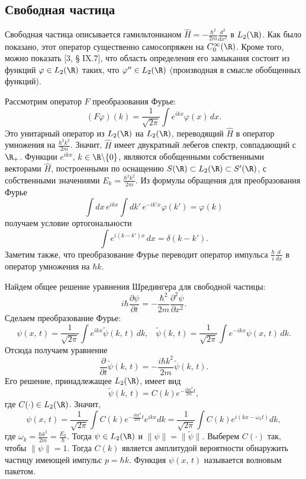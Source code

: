 \documentclass[a4paper
]{article}
\begin{document}
\subsection{Свободная частица}
Свободная частица описывается гамильтонианом $\hat H=-\frac{\hbar^2}
{2m}\frac{d^2}{dx^2}$ в $L_2(\R)$. Как было показано, этот оператор
существенно самосопряжен на $C_0^\infty(\R)$. Кроме того, можно показать [3, \S
IX.7], что область определения его замыкания состоит из функций $\varphi\in L_2(\R)$
таких, что $\varphi ''\in L_2(\R)$ (производная в смысле обобщенных функций). \par
Рассмотрим оператор $F$ преобразования Фурье: $$(F\varphi)(k)=\frac{1}{\sqrt{2\pi}}
\int e^{ikx}\varphi(x)\, dx.$$ Это унитарный
оператор из $L_2(\R)$ на $L_2(\R)$, переводящий $\hat H$ в оператор
умножения на $\frac{\hbar^2k^2}{2m}$. Значит, $\hat H$ имеет двукратный
лебегов спектр, совпадающий с $\R_+$. Функции $e^{ikx}$, $k\in \R\backslash
\{0\}$, являются обобщенными собственными векторами $\hat H$,
построенными по оснащению $S(\R)\subset L_2(\R)\subset S'(\R)$, с собственными
значениями $E_k=\frac{\hbar^2 k^2}{2m}$. Из формулы обращения для преобразования
Фурье
$$\int dx\, e^{ikx}\int dk'\, e^{-ik'x}\varphi(k')=\varphi(k)$$
получаем условие ортогональности $$\int e^{i(k-k')x}\, dx=\delta(k-k').$$
Заметим также, что преобразование Фурье переводит оператор импульса $\frac{\hbar}{i}
\frac{d}{dx}$ в оператор умножения на $\hbar k$. \par
Найдем общее решение уравнения Шредингера для свободной частицы:
$$i\hbar\frac{\partial \psi}{\partial t}=-\frac{\hbar^2}{2m}\frac
{\partial^2\psi}{\partial x^2}.$$ Сделаем преобразование Фурье:
$$\psi(x, \, t)=\frac{1}{\sqrt{2\pi}}\int e^{ikx}\tilde \psi(k, \,
t)\, dk, \; \; \; \tilde \psi(k, \, t)=\frac{1}{\sqrt{2\pi}}\int e^{-ikx}
\psi(x, \, t)\, dk.$$
Отсюда получаем уравнение $$\frac{\partial}{\partial t}\tilde \psi(k, \, t)=
-\frac{i\hbar k^2}{2m}\tilde \psi(k, \, t).$$ Его решение, принадлежащее
$L_2(\R)$, имеет вид
$$\tilde \psi(k, \, t)=C(k)e^{-\frac{i\hbar k^2}{2m}t},$$ где
$C(\cdot)\in L_2(\R)$. Значит, $$\psi(x, \, t)=\frac{1}{\sqrt{2\pi}}
\int C(k)e^{-\frac{i\hbar k^2}{2m}t}e^{ikx}dk=\frac{1}{\sqrt{2\pi}}
\int C(k)e^{i(kx-\omega_k t)}dk,$$ где $\omega_k=\frac{\hbar k^2}{2m}=\frac{E_k}{\hbar}$.
Тогда $\psi\in L_2(\R)$ и $\|\psi\|
=\|\tilde \psi\|$. Выберем $C(\cdot)$ так, чтобы $\|\psi\|=1$. Тогда
$C(k)$ является амплитудой вероятности обнаружить частицу имеющей
импульс $p=\hbar k$. Функция $\psi(x, \, t)$ называется волновым пакетом. \par
\end{document}
